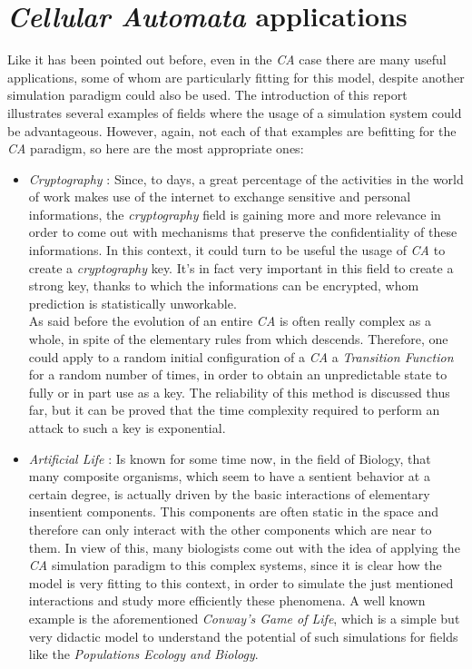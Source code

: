 \documentclass[12pt,a4paper,fleqn]{report}
\begin{document}
\section{\textit{Cellular Automata}  applications}

Like it has been pointed out before, even in the \textit{CA} case there are many useful applications, some of whom are particularly fitting for this model, despite another simulation paradigm could also be used. The introduction of this report illustrates several examples of fields where the usage of a simulation system could be advantageous. However, again, not each of that examples are befitting for the  \textit{CA} paradigm, so here are the most appropriate ones:
\begin{itemize}
\item
\textit{Cryptography} : Since, to days, a great percentage of the activities in the world of work makes use of the internet to exchange sensitive and personal informations, the \textit{cryptography} field is gaining more and more relevance in order to come out with mechanisms that preserve the confidentiality of these informations. In this context, it could turn to be useful the usage of \textit{CA} to create a \textit{cryptography} key. It's in fact very important in this field to create a strong key, thanks to which the informations can be encrypted, whom prediction is statistically unworkable. \\
As said before the evolution of an entire \textit{CA} is often really complex as a whole,  in spite of the elementary rules from which descends. Therefore, one could apply to a random initial configuration of a \textit{CA} a \textit{Transition Function} for a random number of times, in order to obtain an unpredictable state to fully or in part use as a key. The reliability of this method is discussed thus far, but it can be proved that the time complexity required to perform an attack to such a key is exponential.
\item
\textit{Artificial Life} : Is known for some time now, in the field of Biology, that many composite organisms, which seem to have a sentient behavior at a certain degree, is actually driven by the basic interactions of elementary insentient components. This components are often static in the space and therefore can only interact with the other components which are near to them. In view of this, many biologists come out with the idea of applying the \textit{CA} simulation paradigm to this complex systems, since it is clear how the model is very fitting to this context, in order to simulate the just mentioned interactions and study more efficiently these phenomena. A well known example is the aforementioned \textit{Conway's Game of Life}, which is a simple but very didactic model to understand the potential of such simulations for fields like the \textit{Populations Ecology and Biology}. 


\end{itemize}
\end{document}
